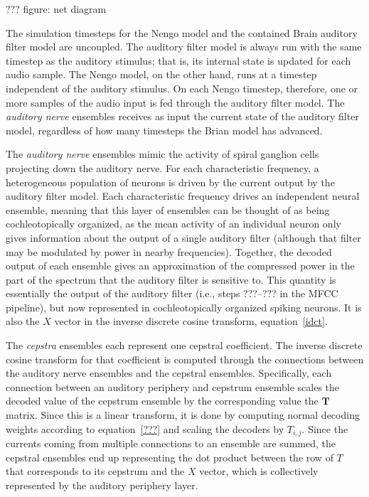 ??? figure: net diagram

The simulation timesteps
for the Nengo model and the contained
Brain auditory filter model
are uncoupled.
The auditory filter model
is always run with the same timestep
as the auditory stimulus;
that is, its internal state is updated
for each audio sample.
The Nengo model, on the other hand,
runs at a timestep independent
of the auditory stimulus.
On each Nengo timestep,
therefore, one or more samples
of the audio input
is fed through the
auditory filter model.
The \textit{auditory nerve} ensembles
receives as input the current
state of the auditory filter model,
regardless of how many timesteps
the Brian model has advanced.

The \textit{auditory nerve} ensembles
mimic the activity of spiral ganglion cells
projecting down the auditory nerve.
For each characteristic frequency,
a heterogeneous population of neurons
is driven by the current output by
the auditory filter model.
Each characteristic frequency
drives an independent neural ensemble,
meaning that this layer of ensembles
can be thought of as being cochleotopically organized,
as the mean activity of an individual neuron
only gives information about the output
of a single auditory filter
(although that filter may be modulated
by power in nearby frequencies).
Together, the decoded output of
each ensemble gives an approximation of
the compressed power in the part of the spectrum
that the auditory filter is sensitive to.
This quantity is essentially
the output of the auditory filter
(i.e., steps ???--??? in the MFCC pipeline),
but now represented in
cochleotopically organized spiking neurons.
It is also the $X$ vector in
the inverse discrete cosine transform,
equation~\eqref{idct}.

The \textit{cepstra} ensembles
each represent one cepstral coefficient.
The inverse discrete cosine transform
for that coefficient is computed
through the connections between
the auditory nerve ensembles
and the cepstral ensembles.
Specifically, each connection
between an auditory periphery
and cepstrum ensemble
scales the decoded value of the
cepstrum ensemble by
the corresponding value
the $\mathbf{T}$ matrix.
Since this is a linear transform,
it is done by computing
normal decoding weights
according to equation~\eqref{???}
and scaling the decoders by $T_{i,j}$.
Since the currents coming from
multiple connections to an ensemble
are summed, the cepstral ensembles
end up representing the
dot product between the row of
$T$ that corresponds to its cepstrum
and the $X$ vector,
which is collectively represented
by the auditory periphery layer.

